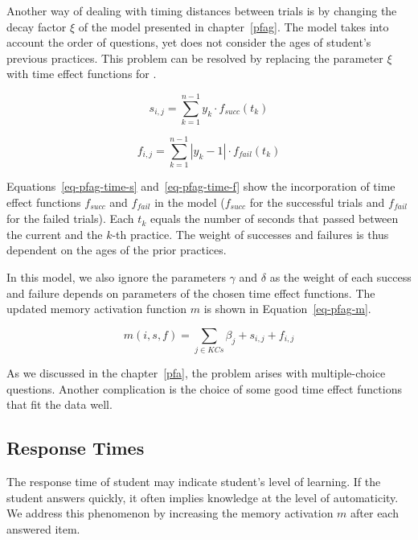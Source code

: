 Another way of dealing with timing distances between trials is by changing the decay factor $\xi$ of the model presented in chapter~\ref{pfag}. The model takes into account the order of questions, yet does not consider the ages of student's previous practices. This problem can be resolved by replacing the parameter $\xi$ with time effect functions for .

\begin{equation} \label{eq-pfag-time-s}
  s_{i,j} = \sum_{k=1}^{n-1} y_k \cdot f_{\mathit{succ}}(t_k)
\end{equation}

\begin{equation} \label{eq-pfag-time-f}
  f_{i,j} = \sum_{k=1}^{n-1} |y_k - 1| \cdot f_{\mathit{fail}}(t_k)
\end{equation}

Equations~\ref{eq-pfag-time-s} and~\ref{eq-pfag-time-f} show the incorporation of time effect functions $f_{\mathit{succ}}$ and $f_{\mathit{fail}}$ in the model ($f_{\mathit{succ}}$ for the successful trials and $f_{\mathit{fail}}$ for the failed trials). Each $t_k$ equals the number of seconds that passed between the current and the $k$-th practice. The weight of successes and failures is thus dependent on the ages of the prior practices.

In this model, we also ignore the parameters $\gamma$ and $\delta$ as the weight of each success and failure depends on parameters of the chosen time effect functions. The updated memory activation function $m$ is shown in Equation~\ref{eq-pfag-m}.

\begin{equation} \label{eq-pfag-m}
  m(i,s,f) = \sum_{j \in KCs} \beta_j + s_{i,j} + f_{i,j} 
\end{equation}

As we discussed in the chapter~\ref{pfa}, the problem arises with multiple-choice questions. Another complication is the choice of some good time effect functions that fit the data well.

\subsection{Response Times}
\label{pfart}

The response time of student may indicate student's level of learning. If the student answers quickly, it often implies knowledge at the level of automaticity. We address this phenomenon by increasing the memory activation $m$ after each answered item.

